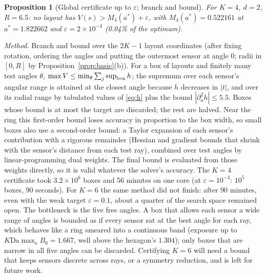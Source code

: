 \documentclass[11pt]{article}
\newtheorem{proposition}[theorem]{Proposition}
\theoremstyle{remark}
\newcommand{\Da}{\mathrm{Da}}
\begin{document}
\begin{proposition}[Global certificate up to $\varepsilon$; branch and bound]\label{prop:bnb}
For $K=4$, $d=2$, $R=6.5$: no layout has $V(s)>M_4(a^*)+\varepsilon$, with
$M_4(a^*)=0.522161$ at $a^*=1.822662$ and $\varepsilon=2\times10^{-4}$ (0.04\% of the optimum).
\end{proposition}
\noindent\emph{Method.} Branch and bound over the $2K-1$ layout coordinates (after fixing
rotation, ordering the angles and putting the outermost sensor at angle $0$; radii in
$[0,R]$ by Proposition~\ref{prop:basic}(b)). For a box of layouts and finitely many test
angles $\theta$, $\max V\le\min_\theta\sum_j\sup_{\rm box}h$; the supremum over each sensor's
angular range is attained at the closest angle because $h$ decreases in $|t|$, and over its
radial range by tabulated values of \eqref{eq:h} plus the bound
$|\partial_a^2h|\le5.5$. Boxes whose bound is at most the target are discarded; the rest are
halved. Near the ring this first-order bound loses accuracy in proportion to the box width,
so small boxes also use a second-order bound: a Taylor expansion of each sensor's contribution
with a rigorous remainder (Hessian and gradient bounds that shrink with the sensor's distance
from each test ray), combined over test angles by linear-programming dual weights. The final
bound is evaluated from those weights directly, so it is valid whatever the solver's
accuracy. The $K=4$ certificate took $3.2\times10^{6}$ boxes and 56 minutes on one core
(at $\varepsilon=10^{-3}$: $10^5$ boxes, 90 seconds).
For $K=6$ the same method did not finish: after 90 minutes, even with the weak target
$\varepsilon=0.1$, about a quarter of the search space remained open. The bottleneck is the
five free angles. A box that allows each sensor a wide range of angles is bounded as if every
sensor sat at the best angle for each ray, which behaves like a ring smeared into a continuous
band (exposure up to $K\Da\max_aB_0=1.667$, well above the hexagon's $1.304$); only boxes that
are narrow in all five angles can be discarded. Certifying $K=6$ will need a bound that keeps
sensors discrete across rays, or a symmetry reduction, and is left for future work.
\end{document}
